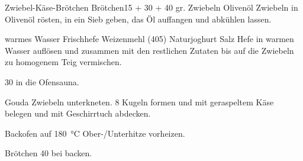 \begin{MyRecipe}{Zwiebel-Käse-Brötchen}{ Brötchen}{\SI{15}{\minuteprime} + \SI{30}{\minuteprime} + \SI{40}{\minuteprime}}
	\ingredient[\Calc{2}{\x}]{} {gr. Zwiebeln}
	\ingredient[\Calc{25}{\x}]{\si{\gram}} {Olivenöl}
	Zwiebeln in Olivenöl rösten, in ein Sieb geben, das Öl auffangen und abkühlen lassen.\par\bigskip

	\ingredient[\Calc{0.1}{\x}]{\si{\liter}} {warmes Wasser}
	 {Frischhefe}
	\ingredient[\Calc{0.3}{\x}]{\si{\kilogram}} {Weizenmehl (405)}
	\ingredient[\Calc{0.13}{\x}]{\si{\kilogram}} {Naturjoghurt}
	 {Salz}
	Hefe in warmen Wasser auflösen und zusammen mit den restlichen Zutaten bis auf die Zwiebeln zu homogenem Teig vermischen.
	
	\SI{30}{\minuteprime} in die Ofensauna.\par\bigskip
	
	
	\ingredient[\Calc{0.1}{\x}]{\si{\kilogram}} {Gouda}
	Zwiebeln unterkneten. 8 Kugeln formen und mit geraspeltem Käse belegen und mit Geschirrtuch abdecken.
	
	Backofen auf \SI{180}{\degreeCelsius} Ober-/Unterhitze vorheizen.
	
	Brötchen \SI{40}{\minuteprime} bei  backen.
	
	
	
\end{MyRecipe}